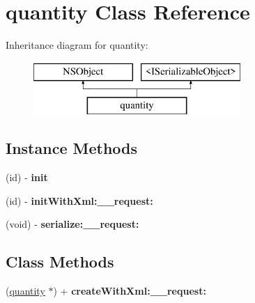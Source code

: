 \hypertarget{interfacequantity}{}\section{quantity Class Reference}
\label{interfacequantity}
Inheritance diagram for quantity\+:\begin{figure}[H]
\begin{center}
\leavevmode
\includegraphics[height=2.000000cm]{interfacequantity}
\end{center}
\end{figure}
\subsection*{Instance Methods}
\begin{DoxyCompactItemize}
\item 
\hypertarget{interfacequantity_a55b5d071167d7c0493e4ea6d8a0e0266}{}(id) -\/ {\bfseries init}\label{interfacequantity_a55b5d071167d7c0493e4ea6d8a0e0266}

\item 
\hypertarget{interfacequantity_ab92b468e4a8844125d7636670d2ccbc7}{}(id) -\/ {\bfseries init\+With\+Xml\+:\+\_\+\+\_\+request\+:}\label{interfacequantity_ab92b468e4a8844125d7636670d2ccbc7}

\item 
\hypertarget{interfacequantity_a0e85dee070fa765f04b111bea822c858}{}(void) -\/ {\bfseries serialize\+:\+\_\+\+\_\+request\+:}\label{interfacequantity_a0e85dee070fa765f04b111bea822c858}

\end{DoxyCompactItemize}
\subsection*{Class Methods}
\begin{DoxyCompactItemize}
\item 
\hypertarget{interfacequantity_af8abcf564f8fe0c3e55ddf0f938599a7}{}(\hyperlink{interfacequantity}{quantity} $\ast$) + {\bfseries create\+With\+Xml\+:\+\_\+\+\_\+request\+:}\label{interfacequantity_af8abcf564f8fe0c3e55ddf0f938599a7}

\end{DoxyCompactItemize}
